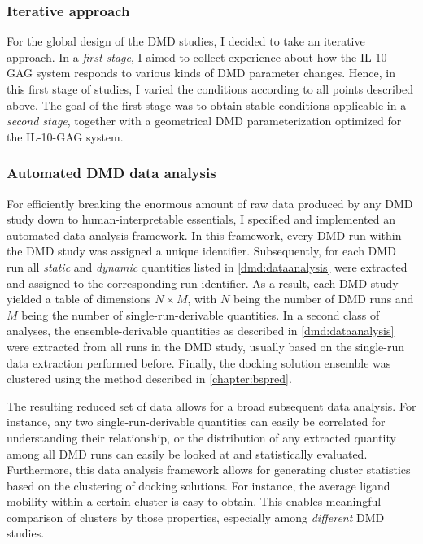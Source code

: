 \subsubsection{Iterative approach}

For the global design of the DMD studies, I decided to take an iterative
approach. In a \textit{first stage}, I aimed to collect experience about how the
IL-10-GAG system responds to various kinds of DMD parameter changes. Hence, in
this first stage of studies, I varied the conditions according to all points
described above. The goal of the first stage was to obtain stable conditions
applicable in a \textit{second stage}, together with a geometrical DMD
parameterization optimized for the IL-10-GAG system.


\subsubsection{Automated DMD data analysis}

For efficiently breaking the enormous amount of raw data produced by any DMD
study down to human-interpretable essentials, I specified and implemented an
automated data analysis framework. In this framework, every DMD run within the
DMD study was assigned a unique identifier. Subsequently, for each DMD run all
\textit{static} and \textit{dynamic} quantities listed in
\cref{dmd:dataanalysis} were extracted and assigned to the corresponding run
identifier. As a result, each DMD study yielded a table of dimensions $N \times
M$, with $N$ being the number of DMD runs and $M$ being the number of
single-run-derivable quantities. In a second class of analyses, the
ensemble-derivable quantities as described in \cref{dmd:dataanalysis} were
extracted from all runs in the DMD study, usually based on the single-run data
extraction performed before. Finally, the docking solution ensemble was
clustered using the method described in \cref{chapter:bspred}.

The resulting reduced set of data allows for a broad subsequent data analysis.
For instance, any two single-run-derivable quantities can easily be correlated
for understanding their relationship, or the distribution of any extracted
quantity among all DMD runs can easily be looked at and statistically evaluated.
Furthermore, this data analysis framework allows for generating cluster
statistics based on the clustering of docking solutions. For instance, the
average ligand mobility within a certain cluster is easy to obtain. This enables
meaningful comparison of clusters by those properties, especially among
\textit{different} DMD studies.


